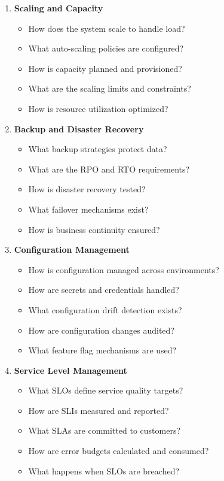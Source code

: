 \documentclass[11pt,letterpaper]{article}
\begin{document}
\begin{enumerate}[label=\textbf{C\arabic*:}, leftmargin=2.5em]
    \item \textbf{Scaling and Capacity}
    \begin{itemize}[nosep]
        \item How does the system scale to handle load?
        \item What auto-scaling policies are configured?
        \item How is capacity planned and provisioned?
        \item What are the scaling limits and constraints?
        \item How is resource utilization optimized?
    \end{itemize}
    
    \item \textbf{Backup and Disaster Recovery}
    \begin{itemize}[nosep]
        \item What backup strategies protect data?
        \item What are the RPO and RTO requirements?
        \item How is disaster recovery tested?
        \item What failover mechanisms exist?
        \item How is business continuity ensured?
    \end{itemize}
    
    \item \textbf{Configuration Management}
    \begin{itemize}[nosep]
        \item How is configuration managed across environments?
        \item How are secrets and credentials handled?
        \item What configuration drift detection exists?
        \item How are configuration changes audited?
        \item What feature flag mechanisms are used?
    \end{itemize}
    
    \item \textbf{Service Level Management}
    \begin{itemize}[nosep]
        \item What SLOs define service quality targets?
        \item How are SLIs measured and reported?
        \item What SLAs are committed to customers?
        \item How are error budgets calculated and consumed?
        \item What happens when SLOs are breached?
    \end{itemize}
    

\end{enumerate}
\end{document}
